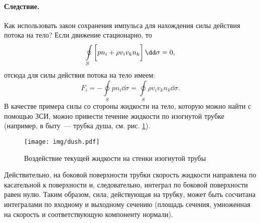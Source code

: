 \paragraph{Следствие.} Как использовать закон сохранения импульса для нахождения силы действия потока на тело? Если движение стационарно, то
\begin{equation}
\oint\limits_{ S } \left[\vphantom{\int} p n _ { i } + \rho v _ { i } v _ { k } n _ { k } \right] \dd \sigma = 0,
\end{equation}
отсюда для силы действия потока на тело имеем:
\begin{equation}
F _ { i } = - \oint \limits_ { S } p n _ { i } \dd{\sigma} = \oint \limits_ { S } \rho v _ { i } v _ { k } n _ { k } \dd{\sigma}\!.
\end{equation}
В качестве примера силы со стороны жидкости на тело, которую можно найти с помощью ЗСИ, можно привести течение жидкости по изогнутой трубке (например, в быту~--- трубка душа, см. рис. \ref{fig:reaction}).
\begin{figure}[H]
	\centering
	\texttt{[image: img/dush.pdf]}
	\caption{Воздействие текущей жидкости на стенки изогнутой трубы}
	\label{fig:reaction}
\end{figure}

Действительно, на боковой поверхности трубки скорость жидкости направлена по касательной к поверхности и, следовательно,  интеграл по боковой поверхности равен нулю. Таким образом, сила,  действующая на трубку, может быть сосчитана интегралами по входному и выходному сечению (площадь сечения, умноженная на скорость и соответствующую компоненту нормали).

